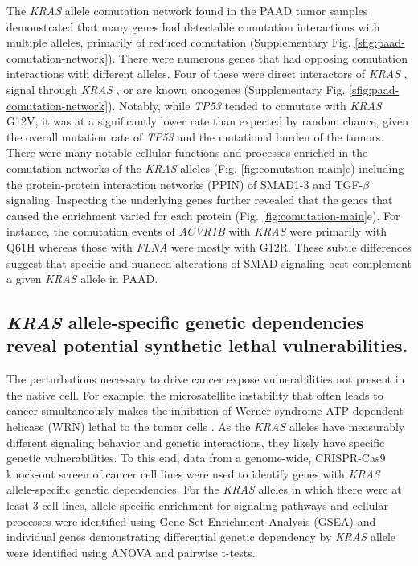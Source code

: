 \documentclass[english, 10pt, letterpaper]{article}
\newcommand{\KRAS}{\emph{KRAS}}
\begin{document}
The \KRAS{} allele comutation network found in the PAAD tumor samples demonstrated that many genes had detectable comutation interactions with multiple alleles, primarily of reduced comutation (Supplementary Fig. \ref{sfig:paad-comutation-network}).
There were numerous genes that had opposing comutation interactions with different alleles.
Four of these were direct interactors of \KRAS{} \cite{Kovalski2019}, signal through \KRAS{} \cite{Kanehisa2017, Kanehisa2016KEGGAnnotation.}, or are known oncogenes \cite{Bamford2004TheWebsite., Sondka2018} (Supplementary Fig. \ref{sfig:paad-comutation-network}).
Notably, while \emph{TP53} tended to comutate with \KRAS{} G12V, it was at a significantly lower rate than expected by random chance, given the overall mutation rate of \emph{TP53} and the mutational burden of the tumors.
There were many notable cellular functions and processes enriched in the comutation networks of the \KRAS{} alleles (Fig. \ref{fig:comutation-main}c) including the protein-protein interaction networks (PPIN) of SMAD1-3 and TGF-$\beta$ signaling.
Inspecting the underlying genes further revealed that the genes that caused the enrichment varied for each protein (Fig. \ref{fig:comutation-main}e).
For instance, the comutation events of \emph{ACVR1B} with \KRAS{} were primarily with Q61H whereas those with \emph{FLNA} were mostly with G12R.
These subtle differences suggest that specific and nuanced alterations of SMAD signaling best complement a given \KRAS{} allele in PAAD.


\subsection*{\KRAS{} allele-specific genetic dependencies reveal potential synthetic lethal vulnerabilities.}

The perturbations necessary to drive cancer expose vulnerabilities not present in the native cell.
For example, the microsatellite instability that often leads to cancer simultaneously makes the inhibition of Werner syndrome ATP-dependent helicase (WRN) lethal to the tumor cells \cite{Behan2019, Chan2019}.
As the \KRAS{} alleles have measurably different signaling behavior and genetic interactions, they likely have specific genetic vulnerabilities.
To this end, data from a genome-wide, CRISPR-Cas9 knock-out screen of cancer cell lines \cite{Tsherniak2017, Meyers2017} were used to identify genes with \KRAS{} allele-specific genetic dependencies.
For the \KRAS{} alleles in which there were at least 3 cell lines, allele-specific enrichment for signaling pathways and cellular processes were identified using Gene Set Enrichment Analysis (GSEA) and individual genes demonstrating differential genetic dependency by \KRAS{} allele were identified using ANOVA and pairwise t-tests.
\end{document}
